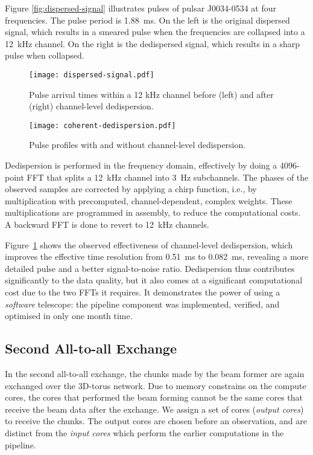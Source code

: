 \documentclass{llncs}
\begin{document}
Figure \ref{fig:dispersed-signal} illustrates pulses of pulsar J0034-0534 at four frequencies. The pulse period is 1.88~ms. On the left is the original dispersed signal, which results in a smeared pulse when the frequencies are collapsed into a 12~kHz channel. On the right is the dedispersed signal, which results in a sharp pulse when collapsed.

\begin{figure}[ht]
\begin{minipage}[t]{0.60\textwidth}
\center
\texttt{[image: dispersed-signal.pdf]}
\caption{Pulse arrival times within a 12 kHz channel before (left) and after (right) channel-level dedispersion.}
\label{fig:dispersed-signal}
\end{minipage}
\hfill
\begin{minipage}[t]{0.35\textwidth}
\center
\texttt{[image: coherent-dedispersion.pdf]}
\caption{Pulse profiles with and without channel-level dedispersion.}
\label{fig:dedispersion-result}
\end{minipage}
\end{figure}

Dedispersion is performed in the frequency domain, effectively by doing a 4096-point FFT that splits a 12~kHz channel into 3~Hz subchannels. The phases of the observed samples are corrected by applying a chirp function, i.e., by multiplication with precomputed, channel-dependent, complex weights. These multiplications are programmed in assembly, to reduce the computational costs. A backward FFT is done to revert to 12~kHz channels.

Figure~\ref{fig:dedispersion-result} shows the observed effectiveness of channel-level dedispersion, which improves the effective time resolution from 0.51~ms to 0.082~ms, revealing a more detailed pulse and a better signal-to-noise ratio. Dedispersion thus contributes significantly to the data quality, but it also comes at a significant computational cost due to the two FFTs it requires. It demonstrates the power of using a \emph{software\/} telescope: the pipeline component was implemented, verified, and optimised in only one month time.

\subsection{Second All-to-all Exchange}

In the second all-to-all exchange, the chunks made by the beam former are again exchanged over the 3D-torus network. Due to memory constrains on the compute cores, the cores that performed the beam forming cannot be the same cores that receive the beam data after the exchange. We assign a set of cores (\emph{output cores}) to receive the chunks. The output cores are chosen before an observation, and are distinct from the \emph{input cores} which perform the earlier computations in the pipeline.
\end{document}
